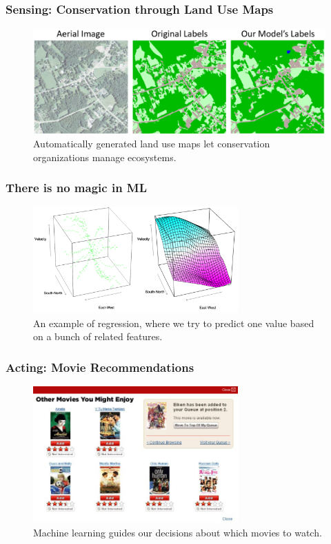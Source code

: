 \documentclass[10pt,mathserif]{beamer}
\begin{document}
\begin{frame}
  \frametitle{Sensing: Conservation through Land Use Maps}
  \begin{figure}[ht]
    \centering
    \includegraphics[width=0.7\paperwidth]{figures/landcover}
    \caption{Automatically generated land use maps let conservation
      organizations manage ecosystems. \label{fig:landcover} }
  \end{figure}
\end{frame}

\begin{frame}
  \frametitle{There is no magic in ML}
  \begin{figure}[ht]
    \centering
    \includegraphics[width=0.7\textwidth]{figures/galaxy}
    \caption{An example of regression, where we try to predict one value based
      on a bunch of related features. \label{fig:astronomy} }
  \end{figure}
\end{frame}

\begin{frame}
  \frametitle{Acting: Movie Recommendations}
  \begin{figure}[ht]
    \centering
    \includegraphics[width=0.7\textwidth]{figures/netflix_abstraction}
    \caption{Machine learning guides our decisions about which movies to watch.}
  \end{figure}
\end{frame}
\end{document}
